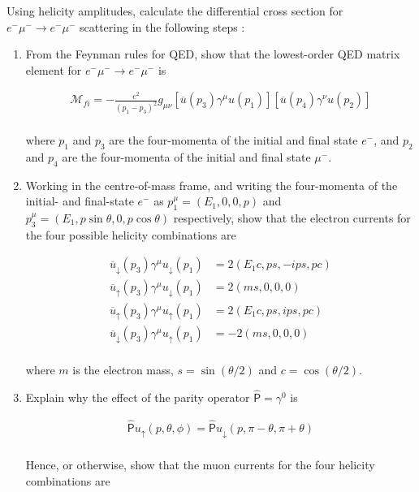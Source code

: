 
\begin{problem}{6.7}
    Using helicity amplitudes, calculate the differential cross section for $e^-\mu^- \to e^-\mu^-$ scattering in the following
    steps :

    \begin{enumerate}[label=(\alph*)]
        \item From the Feynman rules for QED, show that the lowest-order QED matrix element for $e^-\mu^- \to e^-\mu^-$ is 
        
        \begin{align*}
            \mathcal{M}_{fi} = -\frac{e^2}{\left(p_1-p_3\right)^2} g_{\mu\nu} \left[\overbar{u}(p_3)\gamma^\mu u(p_1)\right]\left[\overbar{u}(p_4)\gamma^\nu u(p_2)\right]
        \end{align*}\\
        where $p_1$ and $p_3$ are the four-momenta of the initial and final state $e^-$, and $p_2$ and $p_4$ are the four-momenta of the initial and final state $\mu^-$.

        \item Working in the centre-of-mass frame, and writing the four-momenta of the initial- and final-state $e^-$ as $p_1^\mu = (E_1,0,0,p)$ 
        and $p_3^\mu = (E_1,p\sin\theta,0,p\cos\theta)$ respectively, show that the electron currents for the four possible helicity combinations are

        \begin{align*}
            \overbar{u}_\downarrow(p_3)\gamma^\mu u_\downarrow(p_1) &= 2 (E_1 c , ps,-ips, pc) \\
            \overbar{u}_\uparrow(p_3)\gamma^\mu u_\downarrow(p_1)   &= 2 (ms,0,0,0) \\
            \overbar{u}_\uparrow(p_3)\gamma^\mu u_\uparrow(p_1) &= 2 (E_1 c, ps ,ips,pc) \\
            \overbar{u}_\downarrow(p_3)\gamma^\mu u_\uparrow(p_1) &= -2 (ms,0,0,0)
        \end{align*}\\
        where $m$ is the electron mass, $s=\sin(\theta/2)$ and $c=\cos(\theta/2)$.

        \item Explain why the effect of the parity operator $\hat{\mathsf{P}}=\gamma^0$ is 
        
        \begin{align*}
            \hat{\mathsf{P}} u_\uparrow (p,\theta,\phi) = \hat{\mathsf{P}} u_\downarrow (p,\pi-\theta,\pi+\theta)
        \end{align*}\\
        Hence, or otherwise, show that the muon currents for the four helicity combinations are


\end{enumerate}
\end{problem}
